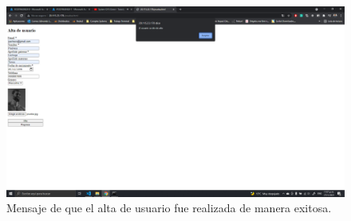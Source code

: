 \documentclass[11pt]{article}
\begin{document}
		\begin{figure}[H]
			\centering
			\includegraphics[scale=0.34]{resources/p9.2.1.png}
			\caption{Mensaje de que el alta de usuario fue realizada de manera exitosa.}\label{fig:picture}
		\end{figure}	
\end{document}
